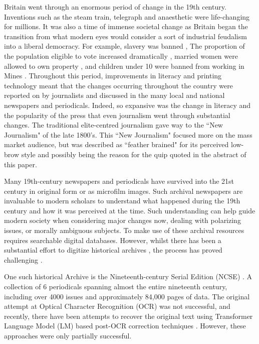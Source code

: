 \documentclass{article} %
\begin{document}
Britain went through an enormous period of change in the 19th century. Inventions such as the steam train, telegraph and anaesthetic were life-changing for millions. It was also a time of immense societal change as Britain began the transition from what modern eyes would consider a sort of industrial feudalism into a liberal democracy. For example, slavery was banned \cite{uk-government_slavery_1833}, The proportion of the population eligible to vote increased dramatically \cite{johnson_history_2013, phillips_great_1995}, married women were allowed to own property \cite{uk-government_married_1882}, and children under 10 were banned from working in Mines \cite{ashley-cooper_act_1842}. Throughout this period, improvements in literacy \cite{stone_literacy_1969} and printing technology meant that the changes occurring throughout the country were reported on by journalists and discussed in the many local and national newspapers and periodicals. Indeed, so expansive was the change in literacy and the popularity of the press that even journalism went through substantial changes. The traditional elite-centred journalism gave way to the ``New Journalism" \cite{hampton_new_2008, twycross_rise_2024} of the late 1800's. This ``New Journalism" focused more on the mass market audience, but was described as ``feather brained"  \cite{arnold_up_1887} for its perceived low-brow style and possibly being the reason for the quip \cite{wilde_critic_1891} quoted in the abstract of this paper.

Many 19th-century newspapers and periodicals have survived into the 21st century in original form or as microfilm images. Such archival newspapers are invaluable to modern scholars to understand what happened during the 19th century and how it was perceived at the time. Such understanding can help guide modern society when considering major changes now, dealing with polarizing issues, or morally ambiguous subjects. To make use of these archival resources requires searchable digital databases. However, whilst there has been a substantial effort to digitize historical archives \cite{terras_rise_2011}, the process has proved challenging \cite{smith_research_2018, chiron_impact_2017}. 

One such historical Archive is the Nineteenth-century Serial Edition (NCSE) \cite{brake_nineteenth-century_2008}. A collection of 6 periodicals spanning almost the entire nineteenth century, including over 4000 issues and approximately 84,000 pages of data. The original attempt at Optical Character Recognition (OCR) was not successful, and recently, there have been attempts to recover the original text using Transformer Language Model (LM) based post-OCR correction techniques \cite{bourne_clocr-c_2024, bourne_scrambled_2024-1}. However, these approaches were only partially successful. 
\end{document}

